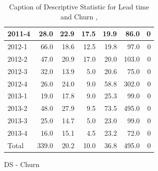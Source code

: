 \documentclass[UKenglish]{ifimaster}  %
\begin{document}
\begin{appendices}
\begin{table}[!htbp]
\begin{adjustwidth}{-2.5cm}{}
\begin{subfigure}[b]{0.3\textwidth}
{\begin{tabular}{ | l | r | r | r | r | r | r | }
2011-4 & 28.0 & 22.9 & 17.5 & 19.9 & 86.0 & 0\\ \hline
2012-1 & 66.0 & 18.6 & 12.5 & 19.8 & 97.0 & 0\\ \hline
2012-2 & 47.0 & 20.9 & 17.0 & 20.0 & 103.0 & 0\\ \hline
2012-3 & 32.0 & 13.9 & 5.0 & 20.6 & 75.0 & 0\\ \hline
2012-4 & 26.0 & 24.0 & 9.0 & 58.8 & 302.0 & 0\\ \hline
2013-1 & 19.0 & 17.8 & 9.0 & 25.3 & 99.0 & 0\\ \hline
2013-2 & 48.0 & 27.9 & 9.5 & 73.5 & 495.0 & 0\\ \hline
2013-3 & 25.0 & 14.7 & 5.0 & 23.0 & 99.0 & 0\\ \hline
2013-4 & 16.0 & 15.1 & 4.5 & 23.2 & 72.0 & 0\\ \hline
Total & 339.0 & 20.2 & 10.0 & 36.8 & 495.0 & 0\\ \hline
\end{tabular}
}
\caption{DS - Churn}
 \label{DS:Churn:1}
\end{subfigure}
\end{adjustwidth}
\caption[Optional caption for list of figures]{Caption of Descriptive Statistic for Lead time and Churn  , }
\label{DS:1:3} %
\end{table}


\end{appendices}
\end{document}
